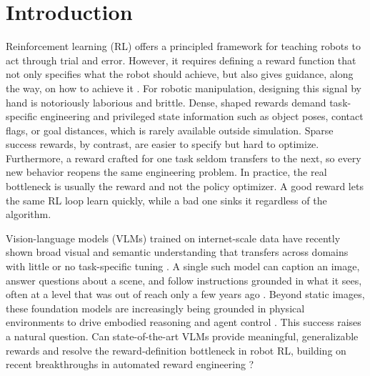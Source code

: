 \chapter{Introduction}
\label{sec:introduction}

Reinforcement learning (RL) offers a principled framework for teaching robots to act through trial and error. However, it requires defining a reward function that not only specifies what the robot should achieve, but also gives guidance, along the way, on how to achieve it \citep{ng_policy_1999}. For robotic manipulation, designing this signal by hand is notoriously laborious and brittle. Dense, shaped rewards demand task-specific engineering and privileged state information such as object poses, contact flags, or goal distances, which is rarely available outside simulation. Sparse success rewards, by contrast, are easier to specify but hard to optimize. Furthermore, a reward crafted for one task seldom transfers to the next, so every new behavior reopens the same engineering problem. In practice, the real bottleneck is usually the reward and not the policy optimizer. A good reward lets the same RL loop learn quickly, while a bad one sinks it regardless of the algorithm.

Vision-language models (VLMs) trained on internet-scale data have recently shown broad visual and semantic understanding that transfers across domains with little or no task-specific tuning \citep{radford_learning_2021, flamingo_2022, bai_qwen-vl_2023, liu_visual_2023}. A single such model can caption an image, answer questions about a scene, and follow instructions grounded in what it sees, often at a level that was out of reach only a few years ago \citep{openai_gpt-4_2023}. Beyond static images, these foundation models are increasingly being grounded in physical environments to drive embodied reasoning and agent control \citep{driess_palm-e_2023}. This success raises a natural question. Can state-of-the-art VLMs provide meaningful, generalizable rewards and resolve the reward-definition bottleneck in robot RL, building on recent breakthroughs in automated reward engineering \citep{ma_eureka_2024}?

